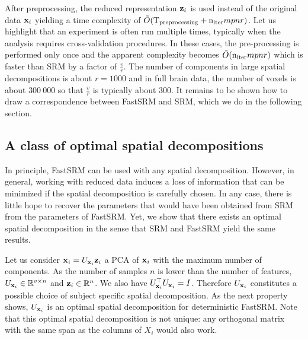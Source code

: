 \documentclass{article}
\newcommand{\bt}[1]{\todo[color=orange, inline=True]{BT: #1}}
\begin{document}
After preprocessing, the reduced representation $\mathbf{z}_i$ is used instead of the
original data $\mathbf{x}_i$ yielding a time complexity of $\tilde{O}(
\mathrm{T_{preprocessing}} + \mathrm{n_{iter}} mpnr)$.
%
Let us highlight that an experiment is often run multiple times,
typically when the analysis requires cross-validation procedures.
%
In these cases,
the pre-processing is performed only once and the apparent complexity becomes
$\tilde{O}(\mathrm{n_{iter}} mpnr)$ which is faster than SRM by
a factor of $\frac{v}{r}$.
%
The number of components in large spatial decompositions is about $r=1000$ and in full brain data,
the number of voxels is about $300~000$ so that $\frac{v}{r}$ is typically about
$300$.
%
It remains to be shown how to draw a correspondence between FastSRM
and SRM, which we do in the following section.
%


\subsection{A class of optimal spatial decompositions}
\label{sec:optimal_atlas}
In principle, FastSRM can be used with any spatial decomposition.
%
However, in general, working with reduced data induces a loss of information
that can be minimized if the spatial decomposition is carefully chosen.
%
In any case, there is little hope to recover the parameters that would have been
obtained from SRM from the parameters of FastSRM.
%
Yet, we show that there exists an optimal spatial decomposition in the
sense that SRM and FastSRM yield the same results.


Let us consider $\mathbf{x}_i = U_{\mathbf{x}_i} \mathbf{z}_i$
%
%
a PCA of $\mathbf{x}_i$ with the maximum
number of components.
%
As the number of
samples $n$ is lower than the number of features, $U_{\mathbf{x}_i} \in \mathbb{R}^{v \times
  n}$ and $\mathbf{z}_i \in \mathbb{R}^{n}$.
%
We also have $U_{\mathbf{x}_i}^{\top}U_{\mathbf{x}_i} = I$.
%
Therefore $U_{\mathbf{x}_i}$ constitutes a possible choice of subject specific spatial decomposition.
%
As the next property shows, $U_{\mathbf{x}_i}$ is an optimal spatial decomposition for deterministic
FastSRM. Note that this optimal spatial decomposition is not unique: any orthogonal matrix with
the same span as the columns of $X_i$ would also work.
%
\end{document}
